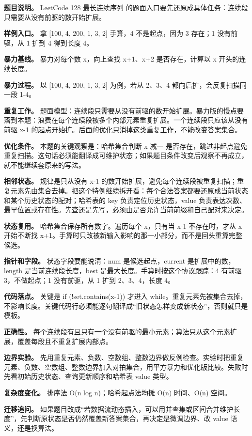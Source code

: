 \textbf{题目说明。} LeetCode 128 最长连续序列 的题面入口要先还原成具体任务：连续段只需要从没有前驱的数开始扩展。

\textbf{样例入口。} 拿 [100, 4, 200, 1, 3, 2] 手算，4 不是起点，因为 3 存在；1 没有前驱，从 1 扩到 4 得到长度 4。

\textbf{暴力基线。} 暴力对每个数 x，向上查找 x+1、x+2 是否存在，计算以 x 开头的连续长度。

\textbf{暴力过程。} 以 [100, 4, 200, 1, 3, 2] 为例，若从 2、3、4 都向后扩，会反复扫描同一段 1-4。

\textbf{重复工作。} 题面模型：连续段只需要从没有前驱的数开始扩展。暴力版的慢点要落到本题：浪费在每个连续段被多个内部元素重复扩展。一个连续段只应该从没有前驱 x-1 的起点开始扩。后面的优化只消掉这类重复工作，不能改变答案集合。

\textbf{优化条件。} 本题的关键观察是：哈希集合判断 x 减一 是否存在，跳过非起点避免重复扫描。这句话必须能翻译成可维护状态；如果题目条件改变后观察不再成立，就不能继续套原来的写法。

\textbf{相邻状态。} 规律是只从没有 x-1 的数开始扩展，避免每个连续段被重复扫描；重复元素先由集合去掉。把这个特例继续拆开看：每个合法答案都要还原成当前状态和某个历史状态的配对；哈希表的 key 负责定位历史状态，value 负责表达次数、最早位置或存在性。先查还是先写，必须由是否允许当前前缀和自己配对来决定。

\textbf{状态复用。} 哈希集合保存所有数字。遍历每个 x，只有当 x-1 不存在时，才从 x 开始不断找 x+1。手算时只改被新输入影响的那一小部分，而不是回头重算完整候选。

\textbf{指针和字段。} 状态字段要能说清：num 是候选起点，current 是扩展中的数，length 是当前连续段长度，best 是最大长度。手算时按这个协议跟踪：4 有前驱 3，不做起点；1 没有前驱，从 1 扩到 2、3、4，长度 4。

\textbf{代码落点。} 关键是 if (!set.contains(x-1)) 才进入 while。重复元素先被集合去掉，不影响长度。关键代码行必须能逐句翻译成“旧状态怎样变成新状态”，否则就只是模板。

\textbf{正确性。} 每个连续段有且只有一个没有前驱的最小元素；算法只从这个元素扩展，覆盖每段且不重复扩展内部点。

\textbf{边界实验。} 先用重复元素、负数、空数组、整数边界做反例检查。实验时把重复元素、负数、空数组、整数边界加入对拍集合，用平方暴力和优化版比较。失败时先看初始历史状态、查询更新顺序和哈希表 value 类型。

\textbf{复杂度变化。} 排序法 O(n log n)；哈希起点法均摊 O(n) 时间、O(n) 空间。

\textbf{迁移追问。} 如果题目改成“若数据流动态插入，可以用并查集或区间合并维护长度”，先判断原状态是否仍然覆盖新答案集合，再决定是微调边界、改 value 语义，还是换算法。

